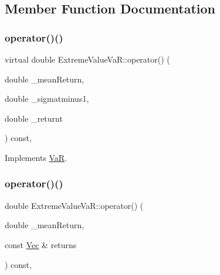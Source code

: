 \subsection{Member Function Documentation}
\hypertarget{classExtremeValueVaR_ad6d31417001a3ee1b75592806d21ae8b}{}\label{classExtremeValueVaR_ad6d31417001a3ee1b75592806d21ae8b} 
\subsubsection{\texorpdfstring{operator()()}{operator()()}\hspace{0.1cm}{\footnotesize\ttfamily [1/3]}}
{\footnotesize\ttfamily virtual double Extreme\+Value\+Va\+R\+::operator() (\begin{DoxyParamCaption}\item[{double}]{\+\_\+mean\+Return,  }\item[{double}]{\+\_\+sigmatminus1,  }\item[{double}]{\+\_\+returnt }\end{DoxyParamCaption}) const\hspace{0.3cm}{\ttfamily [inline]}, {\ttfamily [virtual]}}



Implements \hyperlink{classVaR_a28e1a1be9e386ed4e8503e54db4033bd}{VaR}.

\hypertarget{classExtremeValueVaR_a8dfe4d515f7e4d0260b3ac87c1a52b5f}{}\label{classExtremeValueVaR_a8dfe4d515f7e4d0260b3ac87c1a52b5f} 
\subsubsection{\texorpdfstring{operator()()}{operator()()}\hspace{0.1cm}{\footnotesize\ttfamily [2/3]}}
{\footnotesize\ttfamily double Extreme\+Value\+Va\+R\+::operator() (\begin{DoxyParamCaption}\item[{double}]{\+\_\+mean\+Return,  }\item[{const \hyperlink{compute__returns__eigen_8h_a1eb6a9306ef406d7975f3cbf2e247777}{Vec} \&}]{returns }\end{DoxyParamCaption}) const\hspace{0.3cm}{\ttfamily [inline]}, {\ttfamily [virtual]}}



